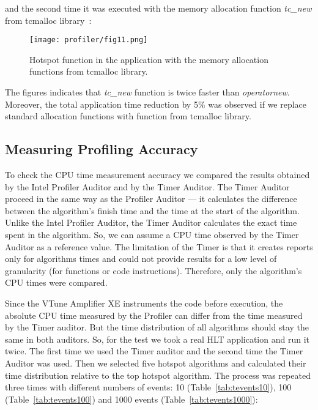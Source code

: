 \noindent and the second time it was executed with the memory allocation function {\it
tc\_new} from tcmalloc library~\cite{perftools}:

\begin{figure}[H]
\texttt{[image: profiler/fig11.png]}
\caption{Hotspot function in the \moore application with the memory allocation functions from tcmalloc 
library.}
\label{fig11}
\end{figure}

The figures indicates that {\it tc\_new} function is twice faster than {\it
operatornew}. Moreover, the total application time reduction by 5\% was
observed if we replace standard allocation functions with function from
tcmalloc library.

\subsection{Measuring Profiling Accuracy}
\label{sec:accuracy}
To check the CPU time measurement accuracy we compared the results obtained by
the \gaudi Intel Profiler Auditor and by the \gaudi Timer Auditor. The Timer
Auditor proceed  in the same way as the Profiler Auditor --- it calculates the
difference between the algorithm’s finish time and the time at the start of the
algorithm. Unlike the \gaudi Intel Profiler Auditor, the Timer Auditor
calculates the exact time spent in the algorithm. So, we can assume a CPU time
observed by the Timer Auditor as a reference value. The limitation of the Timer
is that it creates reports only for algorithms times  and could not provide
results for a low level of granularity (for functions or code instructions).
Therefore, only the algorithm’s CPU times were compared.

Since the VTune Amplifier XE instruments the code before execution, the
absolute CPU time measured by the Profiler can differ from the time measured by
the Timer auditor.  But the time distribution of all algorithms should stay the
same in both auditors.  So, for the test we took a real HLT application and run
it twice. The first time we used the Timer auditor and the second time the
\gaudi Timer Auditor was used. Then we selected five hotspot algorithms and
calculated their time distribution relative to the top hotspot algorithm. The
process was repeated three times with different numbers of events: 10
(Table~\ref{tab:tevents10}), 100 (Table~\ref{tab:tevents100}) and 1000 events
(Table~\ref{tab:tevents1000}):

